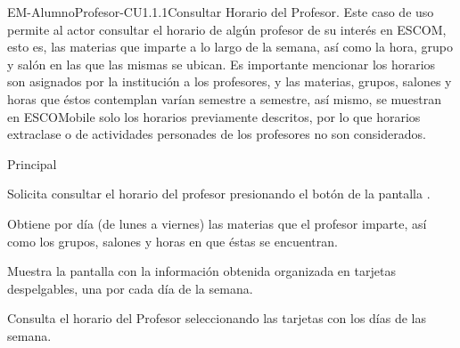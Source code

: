 \begin{UseCase}{EM-AlumnoProfesor-CU1.1.1}{Consultar Horario del Profesor.}{
	\noindent
	Este caso de uso permite al actor consultar el horario de algún profesor de su interés en ESCOM, esto es, las materias que imparte a lo largo de la semana, así como la hora, grupo y salón en las que las mismas se ubican. Es importante mencionar los horarios son asignados por la institución a los profesores, y las materias, grupos, salones y horas que éstos contemplan varían semestre a semestre, así mismo, se muestran en ESCOMobile solo los horarios previamente descritos, por lo que horarios extraclase o de actividades personades de los profesores no son considerados. 
	\newline
	}
\end{UseCase}

\begin{UCtrayectoria}{Principal}

	\UCpaso [\UCactor] Solicita consultar el horario del profesor presionando el botón  de la pantalla .

	\UCpaso Obtiene por día (de lunes a viernes) las materias que el profesor imparte, así como los grupos, salones y horas en que éstas se encuentran. 

	\UCpaso Muestra la pantalla  con la información obtenida organizada en tarjetas despelgables, una por cada día de la semana.

	\UCpaso[\UCactor] Consulta el horario del Profesor seleccionando las tarjetas con los días de las semana.

\end{UCtrayectoria}



